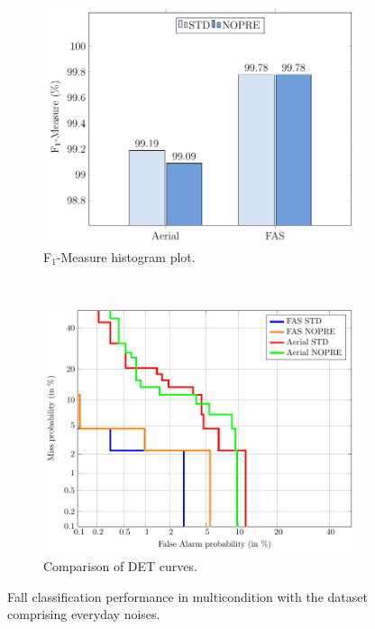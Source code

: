\begin{figure}[t]
	\centering
	\begin{subfigure}[b]{0.8\textwidth}
		\includegraphics[width=\textwidth]{img/winr2016/pgfsource/8_bck_multicondition/BAR_8_bck_multicondition.pdf}
		\caption{F$_1$-Measure histogram plot.}\label{fig:multi_bck_BAR}	
	\end{subfigure}
	~
	\begin{subfigure}[b]{0.8\textwidth}
		\includegraphics[width=\textwidth]{img/winr2016/matlab2tikz/8_bck_multicondition/DET_8_bck_multicondition.pdf}
		\caption{Comparison of DET curves.}\label{fig:multi_bck_DET}	
	\end{subfigure}
	\caption{Fall classification performance in multicondition with the dataset comprising everyday noises.}\label{fig:multi_bck}
	\vspace{-0.25cm}
\end{figure}

